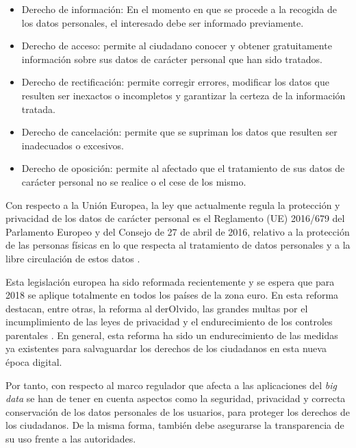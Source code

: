 \clearpage
\begin{itemize}
	\item Derecho de información: En el momento en que se procede a la recogida de los datos personales, el interesado debe ser informado previamente. 
	
	\item Derecho de acceso: permite al ciudadano conocer y obtener gratuitamente información sobre sus datos de carácter personal que han sido tratados.
	
	\item Derecho de rectificación: permite corregir errores, modificar los datos que resulten ser inexactos o incompletos y garantizar la certeza de la información tratada.
	
	\item Derecho de cancelación: permite que se supriman los datos que resulten ser inadecuados o excesivos.
	
	\item Derecho de oposición: permite al afectado que el tratamiento de sus datos de carácter personal no se realice o el cese de los mismo.
\end{itemize}

Con respecto a la Unión Europea, la ley que actualmente regula la protección y privacidad de los datos de carácter personal es el Reglamento (UE) 2016/679 del Parlamento Europeo y del Consejo de 27 de abril de 2016, relativo a la protección de las personas físicas en lo que respecta al tratamiento de datos personales y a la libre circulación de estos datos \cite{lawEU}.

Esta legislación europea ha sido reformada recientemente y se espera que para 2018 se aplique totalmente en todos los países de la zona euro. En esta reforma destacan, entre otras, la reforma al \gls{derOlvido}, las grandes multas por el incumplimiento de las leyes de privacidad y el endurecimiento de los controles parentales \cite{rulesEU}. En general, esta reforma ha sido un endurecimiento de las medidas ya existentes para salvaguardar los derechos de los ciudadanos en esta nueva época digital.

Por tanto, con respecto al marco regulador que afecta a las aplicaciones del \textit{big data} se han de tener en cuenta aspectos como la seguridad, privacidad y correcta conservación de los datos personales de los usuarios, para proteger los derechos de los ciudadanos. De la misma forma, también debe asegurarse la transparencia de su uso frente a las autoridades.

